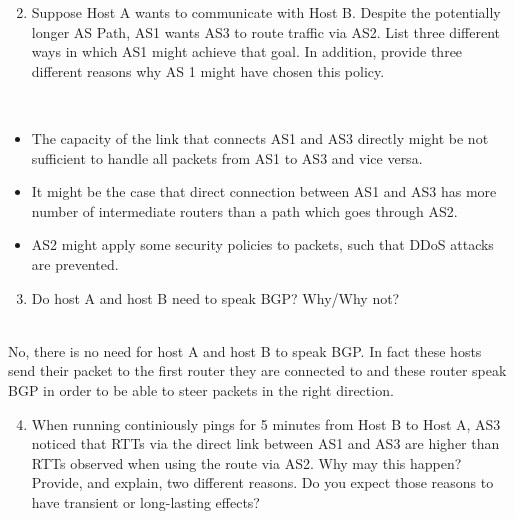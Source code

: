 \begin{enumerate}
    \setcounter{enumi}{1}
    \item
    Suppose Host A wants to communicate with Host B. Despite the potentially longer AS Path,
AS1 wants AS3 to route traffic via AS2. List three different ways in which AS1 might achieve
that goal. In addition, provide three different reasons why AS 1 might have chosen this policy.
\end{enumerate}

\begin{tcolorbox}
    \mysolution{} \\
    \begin{itemize}
        \item The capacity of the link that connects AS1 and AS3 directly might be not sufficient
            to handle all packets from AS1 to AS3 and vice versa. 
        \item It might be the case that direct connection between AS1 and AS3 has more number of
            intermediate routers than a path which goes through AS2. 
        \item AS2 might apply some security policies to packets, such that DDoS attacks are 
            prevented. 
    \end{itemize}
\end{tcolorbox}

\begin{enumerate}
    \setcounter{enumi}{2}
    \item
    Do host A and host B need to speak BGP? Why/Why not?
\end{enumerate}

\begin{tcolorbox}
    \mysolution{} \\
    No, there is no need for host A and host B to speak BGP. In fact these hosts send their 
    packet to the first router they are connected to and these router speak BGP in order
    to be able to steer packets in the right direction. 
\end{tcolorbox}


\begin{enumerate}
    \setcounter{enumi}{3}
    \item
When running continiously pings for 5 minutes from Host B to Host A, AS3 noticed that RTTs
via the direct link between AS1 and AS3 are higher than RTTs observed when using the route
via AS2. Why may this happen? Provide, and explain, two different reasons. Do you expect
those reasons to have transient or long-lasting effects?
\end{enumerate}

